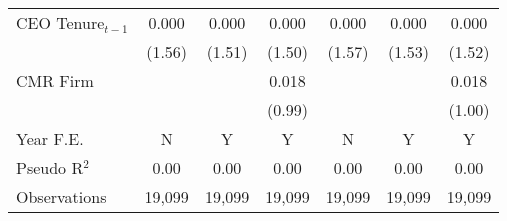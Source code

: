 {\begin{tabular}{l*{6}{c}}
CEO Tenure$ _{t-1} $&    0.000         &    0.000         &    0.000         &    0.000         &    0.000         &    0.000         \\
          &   (1.56)         &   (1.51)         &   (1.50)         &   (1.57)         &   (1.53)         &   (1.52)         \\
CMR Firm  &                  &                  &    0.018         &                  &                  &    0.018         \\
          &                  &                  &   (0.99)         &                  &                  &   (1.00)         \\
\midrule Year F.E. &        N         &        Y         &        Y         &        N         &        Y         &        Y         \\

Pseudo R$ ^2$&     0.00         &     0.00         &     0.00         &     0.00         &     0.00         &     0.00         \\
Observations&   19,099         &   19,099         &   19,099         &   19,099         &   19,099         &   19,099         \\
\bottomrule
\end{tabular}
}
